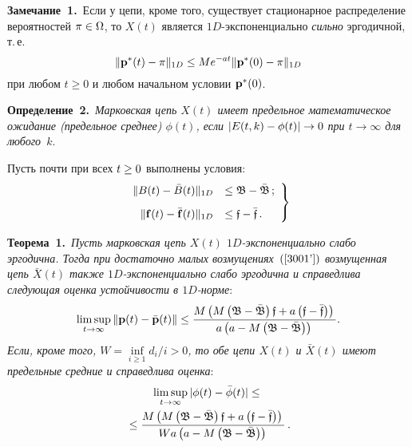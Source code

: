 \begin{multicols}{2}
\smallskip

\noindent
\textbf{Замечание~1.}\
Если у цепи, кроме того, существует стационарное распределение вероятностей ${\bf \pi}
\hm\in \Omega$, то  $X(t)$ является $1D$-экс\-по\-нен\-ци\-аль\-но {\it сильно}
эргодичной, т.\,е.\
\begin{equation}
\|{\bf p^{*}}(t) - {\bf \pi}\|_{1D} \le M e^{-at} \|{\bf p^{*}}(0) -
{\bf \pi}\|_{1D}
\label{d-erg1}
\end{equation}
при любом  $t \ge 0$ и любом начальном условии ${\bf p^{*}}(0)$.


\medskip

\noindent
\textbf{Определение~2.}\
\textit{Марковская цепь  $X(t) $ имеет предельное математическое ожидание
(предельное среднее) $\phi(t)$, если  $|E(t,k) \hm- \phi(t) | \hm\to
0$ при $t \to \infty$ для любого~$k$}.

\medskip

Пусть почти при всех  $t \hm\ge 0$ выполнены условия:
\begin{equation}
\left.
\begin{array}{rl}
\|B(t)-\bar{B}(t)\|_{1D} &\le  \mathfrak{B-\bar{B}}\,; \\[9pt]
\|{\bf f}(t)-\bar{{\bf f}}(t)\|_{1D} &\le \mathfrak{f-\bar{f}}\,.
\end{array}
\right\}
\label{3001'}
\end{equation}

\noindent
\textbf{Теорема~1.}\
\textit{Пусть марковская цепь   $X(t)$ $1D$-экс\-по\-нен\-ци\-аль\-но слабо эргодична.
Тогда при достаточно малых возмущениях~$(\ref{3001'})$ возмущенная цепь $\bar{X}(t)$
также $1D$-экс\-по\-нен\-ци\-аль\-но слабо эргодична и справедлива следующая оценка
устойчивости в $1D$-норме}:
\begin{equation*}
\limsup_{t \to \infty}   \|{\bf p}(t)- {\bar{\bf p}}(t)\| \le
\displaystyle\frac{\displaystyle M\left(M\left(\mathfrak{B-\bar{B}}\right) \mathfrak{f}  +
a\left(\mathfrak{f-\bar{f}}\right)\right)\mathstrut}{\displaystyle a\left(a -
M\left(\mathfrak{B-\bar{B}}\right)\right)\mathstrut}.
\end{equation*}
\textit{Если, кроме того, $W=\inf\limits_{i \ge 1}  {d_i}/{i} > 0$, то обе цепи  $X(t)$ и $\bar{X}(t)$
имеют предельные средние и справедлива оценка}:
\begin{multline}
\limsup_{t \to \infty}  |\phi(t) - \bar{\phi}(t)|\le{}\\
{}\le
\displaystyle\frac{\displaystyle M\left(M\left(\mathfrak{B-\bar{B}}\right) \mathfrak{f}  +
a\left(\mathfrak{f-\bar{f}}\right)\right)\mathstrut}{\displaystyle Wa\left(a -
M\left(\mathfrak{B-\bar{B}}\right)\right)\mathstrut}\,.
\label{3003}
\end{multline}


\end{multicols}

